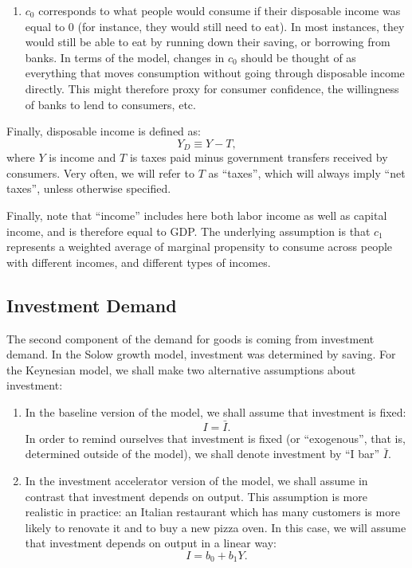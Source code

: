\documentclass[]{book}
\providecommand{\tightlist}{%
  \setlength{\itemsep}{0pt}\setlength{\parskip}{0pt}}
\begin{document}
\begin{enumerate}
\def\labelenumi{\arabic{enumi}.}
\setcounter{enumi}{1}
\tightlist
\item
  \(c_0\) corresponds to what people would consume if their disposable
  income was equal to \(0\) (for instance, they would still need to
  eat). In most instances, they would still be able to eat by running
  down their saving, or borrowing from banks. In terms of the model,
  changes in \(c_0\) should be thought of as everything that moves
  consumption without going through disposable income directly. This
  might therefore proxy for consumer confidence, the willingness of
  banks to lend to consumers, etc.
\end{enumerate}

Finally, disposable income is defined as: \[Y_D \equiv Y - T,\] where
\(Y\) is income and \(T\) is taxes paid minus government transfers
received by consumers. Very often, we will refer to \(T\) as ``taxes'',
which will always imply ``net taxes'', unless otherwise specified.

Finally, note that ``income'' includes here both labor income as well as
capital income, and is therefore equal to GDP. The underlying assumption
is that \(c_1\) represents a weighted average of marginal propensity to
consume across people with different incomes, and different types of
incomes.

\subsection{Investment Demand}\label{investment-demand}

The second component of the demand for goods is coming from investment
demand. In the Solow growth model, investment was determined by saving.
For the Keynesian model, we shall make two alternative assumptions about
investment:

\begin{enumerate}
\def\labelenumi{\arabic{enumi}.}
\item
  In the baseline version of the model, we shall assume that investment
  is fixed: \[I=\bar{I}.\] In order to remind ourselves that investment
  is fixed (or ``exogenous'', that is, determined outside of the model),
  we shall denote investment by ``I bar'' \(\bar{I}\).
\item
  In the investment accelerator version of the model, we shall assume in
  contrast that investment depends on output. This assumption is more
  realistic in practice: an Italian restaurant which has many customers
  is more likely to renovate it and to buy a new pizza oven. In this
  case, we will assume that investment depends on output in a linear
  way: \[I=b_0+b_1 Y.\]
\end{enumerate}
\end{document}
